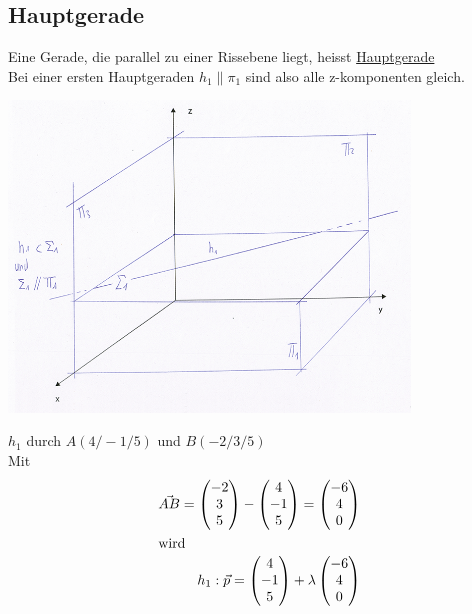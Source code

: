 \subsection{Hauptgerade}
Eine Gerade, die parallel zu einer Rissebene liegt, heisst \underline{Hauptgerade}\\
Bei einer ersten Hauptgeraden $h_1\parallel \pi_1$ sind also alle z-komponenten gleich.\\
\begin{center}
	 \includegraphics[width=0.8\textwidth]{imgs/hauptgerade.png}
 \end{center}
\begin{myexample}
$h_1$ durch $A(4/-1/5)$ und $B(-2/3/5)$\\
Mit
\begin{eqnarray*}
	\vec{AB} = \begin{pmatrix}-2\\3\\5\end{pmatrix} - \begin{pmatrix}4\\-1\\5\end{pmatrix} = \begin{pmatrix}-6\\4\\0\end{pmatrix}\\
	\shortintertext{wird}
	h_1: \vec{p} = \begin{pmatrix}4\\-1\\5\end{pmatrix} + \lambda\begin{pmatrix}-6\\4\\0\end{pmatrix}	
\end{eqnarray*}
\end{myexample}

